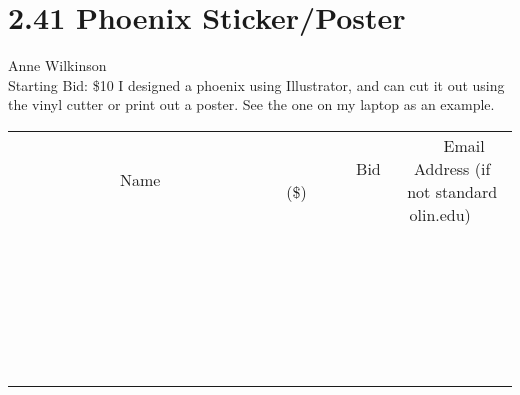 \documentclass[11pt]{article}
\begin{document}
\section*{2.41 Phoenix Sticker/Poster}
Anne Wilkinson
\\
Starting Bid: \$10
\newline
I designed a phoenix using Illustrator, and can cut it out using the vinyl cutter or print out a poster. See the one on my laptop as an example.
\\[6ex]
\begin{tabular}{c c c}
~~~~~~~~~~~~~Name~~~~~~~~~~~~~ & ~~~~~~~~~Bid (\$)~~~~~~~~~  & ~~~Email Address (if not standard olin.edu)~~~\\
 & & \\
\hline
 & & \\
\hline
 & & \\
\hline
 & & \\
\hline
 & & \\
\hline
 & & \\
\hline
 & & \\
\hline
 & & \\
\hline
 & & \\
\hline
 & & \\
\hline
 & & \\
\hline
 & & \\
\hline
 & & \\
\hline
 & & \\
\hline
 & & \\
\hline
 & & \\
\hline
 & & \\
\hline
 & & \\
\hline
 & & \\
\hline
 & & \\
\hline
 & & \\
\hline
 & & \\
\hline
 & & \\
\hline
 & & \\
\hline
 & & \\
\hline
 & & \\
\hline
\end{tabular}
\newpage
\end{document}
